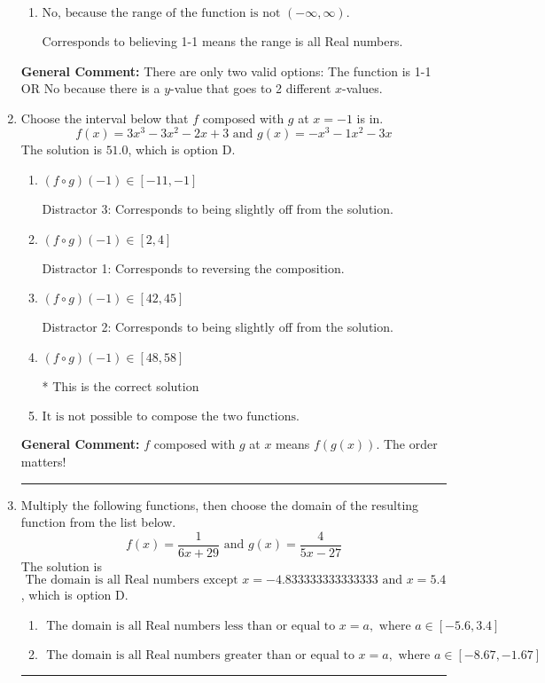 \documentclass{extbook}[14pt]
\newcommand{\litem}[1]{\item #1

\rule{\textwidth}{0.4pt}}
\begin{document}
\begin{enumerate}
{\begin{enumerate}[label=\Alph*.]
* This is the solution.
\item \( \text{No, because the range of the function is not $(-\infty, \infty)$.} \)

Corresponds to believing 1-1 means the range is all Real numbers.
\end{enumerate}

\textbf{General Comment:} There are only two valid options: The function is 1-1 OR No because there is a $y$-value that goes to 2 different $x$-values.
}
\litem{
Choose the interval below that $f$ composed with $g$ at $x=-1$ is in.
\[ f(x) = 3x^{3} -3 x^{2} -2 x + 3 \text{ and } g(x) = -x^{3} -1 x^{2} -3 x \]The solution is \( 51.0 \), which is option D.\begin{enumerate}[label=\Alph*.]
\item \( (f \circ g)(-1) \in [-11, -1] \)

 Distractor 3: Corresponds to being slightly off from the solution.
\item \( (f \circ g)(-1) \in [2, 4] \)

 Distractor 1: Corresponds to reversing the composition.
\item \( (f \circ g)(-1) \in [42, 45] \)

 Distractor 2: Corresponds to being slightly off from the solution.
\item \( (f \circ g)(-1) \in [48, 58] \)

* This is the correct solution
\item \( \text{It is not possible to compose the two functions.} \)


\end{enumerate}

\textbf{General Comment:} $f$ composed with $g$ at $x$ means $f(g(x))$. The order matters!
}
\litem{
Multiply the following functions, then choose the domain of the resulting function from the list below.
\[ f(x) = \frac{1}{6x+29} \text{ and } g(x) = \frac{4}{5x-27} \]The solution is \( \text{ The domain is all Real numbers except } x = -4.833333333333333 \text{ and } x = 5.4 \), which is option D.\begin{enumerate}[label=\Alph*.]
\item \( \text{ The domain is all Real numbers less than or equal to } x = a, \text{ where } a \in [-5.6, 3.4] \)


\item \( \text{ The domain is all Real numbers greater than or equal to } x = a, \text{ where } a \in [-8.67, -1.67] \)



\end{enumerate}}
\end{enumerate}
\end{document}

